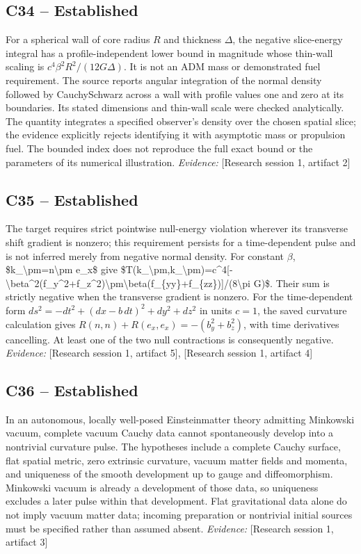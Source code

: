 \documentclass[11pt]{article}
\begin{document}
\begin{sloppypar}
\subsection{C34 -- Established}
For a spherical wall of core radius $R$ and thickness $\Delta$, the negative slice-energy integral has a profile-independent lower bound in magnitude whose thin-wall scaling is $c^4\beta^2R^2/(12G\Delta)$. It is not an ADM mass or demonstrated fuel requirement.
The source reports angular integration of the normal density followed by Cauchy\textendash{}Schwarz across a wall with profile values one and zero at its boundaries. Its stated dimensions and thin-wall scale were checked analytically. The quantity integrates a specified observer's density over the chosen spatial slice; the evidence explicitly rejects identifying it with asymptotic mass or propulsion fuel. The bounded index does not reproduce the full exact bound or the parameters of its numerical illustration.
\textit{Evidence: }[Research session 1, artifact 2]
\subsection{C35 -- Established}
The target requires strict pointwise null-energy violation wherever its transverse shift gradient is nonzero; this requirement persists for a time-dependent pulse and is not inferred merely from negative normal density.
For constant $\beta$, \$k\_\textbackslash{}pm=n\textbackslash{}pm e\_x\$ give \$T(k\_\textbackslash{}pm,k\_\textbackslash{}pm)=c\textasciicircum{}4[-\textbackslash{}beta\textasciicircum{}2(f\_y\textasciicircum{}2+f\_z\textasciicircum{}2)\textbackslash{}pm\textbackslash{}beta(f\_\{yy\}+f\_\{zz\})]/(8\textbackslash{}pi G)\$. Their sum is strictly negative when the transverse gradient is nonzero. For the time-dependent form $ds^2=-dt^2+(dx-b\,dt)^2+dy^2+dz^2$ in units $c=1$, the saved curvature calculation gives $R(n,n)+R(e_x,e_x)=-(b_y^2+b_z^2)$, with time derivatives cancelling. At least one of the two null contractions is consequently negative.
\textit{Evidence: }[Research session 1, artifact 5], [Research session 1, artifact 4]
\subsection{C36 -- Established}
In an autonomous, locally well-posed Einstein\textendash{}matter theory admitting Minkowski vacuum, complete vacuum Cauchy data cannot spontaneously develop into a nontrivial curvature pulse.
The hypotheses include a complete Cauchy surface, flat spatial metric, zero extrinsic curvature, vacuum matter fields and momenta, and uniqueness of the smooth development up to gauge and diffeomorphism. Minkowski vacuum is already a development of those data, so uniqueness excludes a later pulse within that development. Flat gravitational data alone do not imply vacuum matter data; incoming preparation or nontrivial initial sources must be specified rather than assumed absent.
\textit{Evidence: }[Research session 1, artifact 3]

\end{sloppypar}
\end{document}
